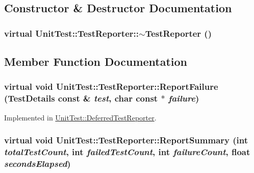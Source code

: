 \subsection{Constructor \& Destructor Documentation}
\hypertarget{class_unit_test_1_1_test_reporter_ec56679564992823f2076b949aed31df}{
\subsubsection[{$\sim$TestReporter}]{\setlength{\rightskip}{0pt plus 5cm}virtual UnitTest::TestReporter::$\sim$TestReporter ()}}
\label{class_unit_test_1_1_test_reporter_ec56679564992823f2076b949aed31df}




\subsection{Member Function Documentation}
\hypertarget{class_unit_test_1_1_test_reporter_55195826cc03302f7a54f728c79102d5}{
\subsubsection[{ReportFailure}]{\setlength{\rightskip}{0pt plus 5cm}virtual void UnitTest::TestReporter::ReportFailure ({\bf TestDetails} const \& {\em test}, \/  char const $\ast$ {\em failure})}}
\label{class_unit_test_1_1_test_reporter_55195826cc03302f7a54f728c79102d5}




Implemented in \hyperlink{class_unit_test_1_1_deferred_test_reporter_32e8e1e99e3169072d8f49f92f27ed5c}{UnitTest::DeferredTestReporter}.\hypertarget{class_unit_test_1_1_test_reporter_8f5010c52b4be55ac4796e24cc669274}{
\subsubsection[{ReportSummary}]{\setlength{\rightskip}{0pt plus 5cm}virtual void UnitTest::TestReporter::ReportSummary (int {\em totalTestCount}, \/  int {\em failedTestCount}, \/  int {\em failureCount}, \/  float {\em secondsElapsed})}}
\label{class_unit_test_1_1_test_reporter_8f5010c52b4be55ac4796e24cc669274}




